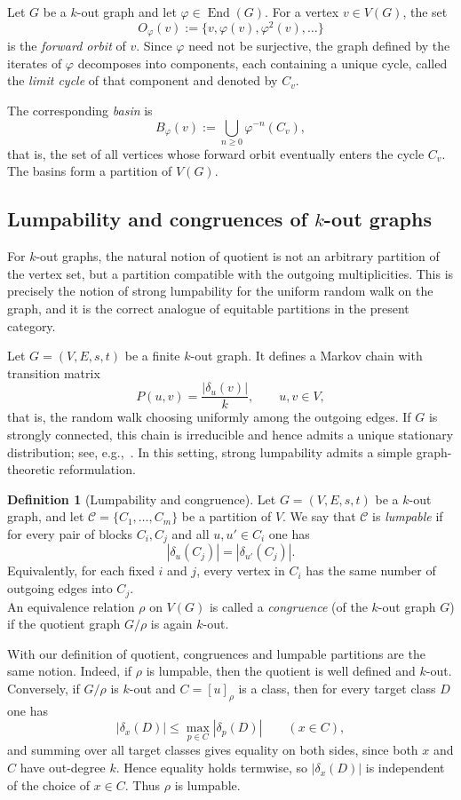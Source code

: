 \documentclass[a4paper,10pt]{amsart}
\theoremstyle{plain}
\theoremstyle{definition}
\newtheorem{definition}[theorem]{Definition}
\DeclareMathOperator{\End}{End}
\begin{document}
Let $G$ be a $k$-out graph and let $\varphi\in\End(G)$. For a vertex $v\in V(G)$, the set
\[
O_\varphi(v):=\{v,\varphi(v),\varphi^2(v),\dots\}
\]
is the \emph{forward orbit} of $v$. Since $\varphi$ need not be surjective, the graph defined by the iterates of $\varphi$ decomposes into components, each containing a unique cycle, called the \emph{limit cycle} of that component and denoted by $C_v$.

The corresponding \emph{basin} is
\[
B_\varphi(v):=\bigcup_{n\ge 0}\varphi^{-n}(C_v),
\]
that is, the set of all vertices whose forward orbit eventually enters the cycle $C_v$. The basins form a partition of $V(G)$.

\subsection{Lumpability and congruences of $k$-out graphs}

For $k$-out graphs, the natural notion of quotient is not an arbitrary partition of the vertex set, but a partition compatible with the outgoing multiplicities. This is precisely the notion of strong lumpability for the uniform random walk on the graph, and it is the correct analogue of equitable partitions in the present category.

Let $G=(V,E,s,t)$ be a finite $k$-out graph. It defines a Markov chain with transition matrix
\[
P(u,v)=\frac{|\delta_u(v)|}{k},
\qquad u,v\in V,
\]
that is, the random walk choosing uniformly among the outgoing edges. If $G$ is strongly connected, this chain is irreducible and hence admits a unique stationary distribution; see, e.g.,~\cite{KemenySnellFMC}. In this setting, strong lumpability admits a simple graph-theoretic reformulation.

\begin{definition}[Lumpability and congruence]
Let $G=(V,E,s,t)$ be a $k$-out graph, and let $\mathcal C=\{C_1,\dots,C_m\}$ be a partition of $V$. We say that $\mathcal C$ is \emph{lumpable} if for every pair of blocks $C_i,C_j$ and all $u,u'\in C_i$ one has
\[
|\delta_u(C_j)|=|\delta_{u'}(C_j)|.
\]
Equivalently, for each fixed $i$ and $j$, every vertex in $C_i$ has the same number of outgoing edges into $C_j$. 
\\
An equivalence relation $\rho$ on $V(G)$ is called a \emph{congruence} (of the $k$-out graph $G$) if the quotient graph $G/\rho$ is again $k$-out.
\end{definition}

With our definition of quotient, congruences and lumpable partitions are the same notion. Indeed, if $\rho$ is lumpable, then the quotient is well defined and $k$-out. Conversely, if $G/\rho$ is $k$-out and $C=[u]_\rho$ is a class, then for every target class $D$ one has
\[
|\delta_x(D)|\le \max_{p\in C} |\delta_p(D)|
\qquad(x\in C),
\]
and summing over all target classes gives equality on both sides, since both $x$ and $C$ have out-degree $k$. Hence equality holds termwise, so $|\delta_x(D)|$ is independent of the choice of $x\in C$. Thus $\rho$ is lumpable.
\end{document}
